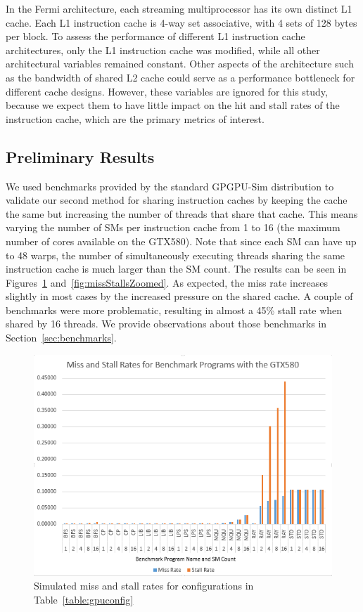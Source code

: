 In the Fermi architecture, each streaming multiprocessor has
its own distinct L1 cache. 
Each L1 instruction cache is 4-way set associative, with 4 sets of
128 bytes per block. 
To assess the  performance of different L1 instruction cache
architectures, only the L1 instruction cache was modified, while all
other architectural variables remained constant. 
Other aspects of the architecture such as the bandwidth of shared L2
cache could serve as a performance bottleneck for different cache
designs. 
However, these variables are ignored for this study, because we expect
them to have little impact on the hit and stall rates of the
instruction cache, which are the primary metrics of interest.

\subsection{Preliminary Results}

We used benchmarks provided by the standard GPGPU-Sim distribution
to validate our second method for sharing instruction caches by
keeping the cache the same but increasing the number of threads that
share that cache.
This means varying the number of SMs per instruction cache from 1 to
16 (the maximum number of cores available on the GTX580).
Note that since each SM can have up to 48 warps, the number of
simultaneously executing threads sharing the same instruction cache is
much larger than the SM count.
The results can be seen in Figures~\ref{fig:missStalls}
and~\ref{fig:missStallsZoomed}. 
As expected, the miss rate increases slightly in most cases by the
increased pressure on the shared cache.
A couple of benchmarks were more problematic, resulting in
almost a 45\% stall rate when shared by 16 threads.
We provide observations about those benchmarks in
Section~\ref{sec:benchmarks}.

\begin{figure}
\centering
\includegraphics[width=\columnwidth]{miss_stalls_benchmarks.png}
\caption{Simulated miss and stall rates for configurations in Table~\ref{table:gpuconfig}}
\label{fig:missStalls}
\end{figure}

